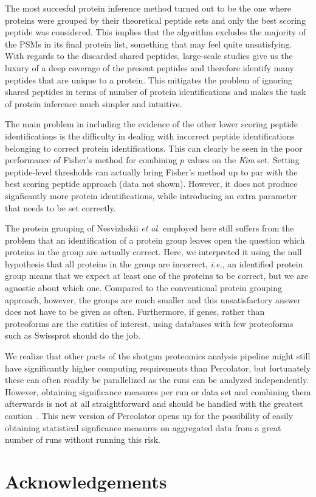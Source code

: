 \documentclass{article}
\begin{document}
The most succesful protein inference method turned out to be the one
where proteins were grouped by their theoretical peptide sets and only
the best scoring peptide was considered. This implies that the
algorithm excludes the majority of the PSMs in its final protein list,
something that may feel quite unsatisfying. With regards to the
discarded shared peptides, large-scale studies give us the luxury of a
deep coverage of the present peptides and therefore identify many
peptides that are unique to a protein. This mitigates the problem of
ignoring shared peptides in terms of number of protein identifications
and makes the task of protein inference much simpler and intuitive.

The main problem in including the evidence of the other lower scoring
peptide identifications is the difficulty in dealing with incorrect
peptide identifications belonging to correct protein identifications.
This can clearly be seen in the poor performance of Fisher's method
for combining $p$ values on the {\em Kim} set. Setting
peptide-level thresholds can actually bring Fisher's method up to par
with the best scoring peptide approach (data not shown). However,
it does not produce signficantly more protein identifications,
while introducing an extra parameter that needs to be set correctly.

The protein grouping of Nesvizhskii {\em et al.} employed here still
suffers from the problem that an identification of a protein group
leaves open the question which proteins in the group are actually
correct. Here, we interpreted it using the null hypothesis that all
proteins in the group are incorrect, {\em i.e.}, an identified protein
group means that we expect at least one of the proteins to be correct,
but we are agnostic about which one. Compared to the conventional
protein grouping approach, however, the groups are much smaller and
this unsatisfactory answer does not have to be given as often.
Furthermore, if genes, rather than proteoforms are the entities of
interest, using databases with few proteoforms such as Swissprot
should do the job.

We realize that other parts of the shotgun proteomics analysis
pipeline might still have significantly higher computing requirements
than Percolator, but fortunately these can often readily be
parallelized as the runs can be analyzed independently. However,
obtaining significance measures per run or data set and combining them
afterwards is not at all straightforward and should be handled with
the greatest caution~\cite{serang2015solution}. This new version of
Percolator opens up for the possibility of easily obtaining
statistical signficance measures on aggregated data from a great
number of runs without running this risk.

\section*{Acknowledgements}


{} 

\end{document}
